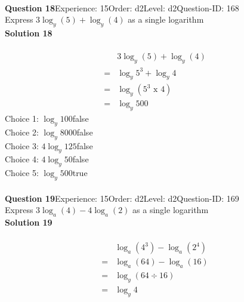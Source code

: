 \documentclass{article}
\begin{document}
\\[4pt]
\noindent\textbf{Question 18}\hspace{20pt}Experience: 15\hspace{20pt}Order: d2\hspace{20pt}Level: d2\hspace{20pt}Question-ID: 168\\[2pt]
Express $3\log_{y}(5)+\log_{y}(4)$ as a single logarithm\\[4pt]
\noindent\textbf{Solution 18}\\[2pt]
\\[-35pt]\begin{align*}
&3\log_{y}(5)+\log_{y}(4)\\[2pt]
=&\log_{y}5^3+\log_{y}4\\[2pt]
=&\log_{y}(5^3 \,\, \text{x} \,\, 4)\\[2pt]
=&\log_{y}500
\end{align*}
Choice 1: \hspace{20pt}$\log_{y}100$\hspace{20pt}false\\
Choice 2: \hspace{20pt}$\log_{y}8000$\hspace{20pt}false\\
Choice 3: \hspace{20pt}$4\log_{y}125$\hspace{20pt}false\\
Choice 4: \hspace{20pt}$4\log_{y}50$\hspace{20pt}false\\
Choice 5: \hspace{20pt}$\log_{y}500$\hspace{20pt}true\\
\\[4pt]
\noindent\textbf{Question 19}\hspace{20pt}Experience: 15\hspace{20pt}Order: d2\hspace{20pt}Level: d2\hspace{20pt}Question-ID: 169\\[2pt]
Express $3\log_{a}(4)-4\log_{a}(2)$ as a single logarithm\\[4pt]
\noindent\textbf{Solution 19}\\[2pt]
\\[-35pt]\begin{align*}
&\log_{a}(4^3)-\log_{a}(2^4)\\[2pt]
=&\log_{a}(64)-\log_{a}(16)\\[2pt]
=&\log_{y}(64 \div 16)\\[2pt]
=&\log_{y}4
\end{align*}
\end{document}
